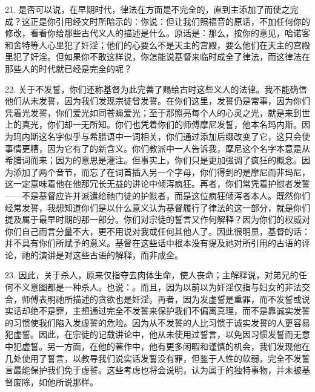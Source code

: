 21. 是否可以说，在早期时代，律法在方面是不完全的，直到主添加了而使之完成？这正是你引用经文时所暗示的：你说：但让我们照福音的原话，不加任何你的修改，看看你给那些古代义人的描述是什么。原话是：那么，按你的意见，哈诺客和舍特等人心里犯了奸淫；他们的心要么不是天主的宫殿，要么他们在天主的宫殿里犯了奸淫。但如果你不敢这样说，你怎能说基督来临时成全了律法，而这律法在那些人的时代就已经是完全的呢？\par

22. 关于不发誓，你们还称基督为此完善了赐给古时这些义人的法律。我不能确信他们从未发誓，因为我们发现宗徒曾发誓。在你们这里，发誓仍是常事，因为你们凭着光发誓，你们爱光如同苍蝇爱光；至于那照亮每个人的心灵之光，就是来到世上的真光，你们却一无所知。你们也凭着你们的师傅摩尼发誓，他本名玛内斯。因为玛内斯这名字似乎与希腊语中一词相关，你们通过添加后缀改变了它，这只会使事情更糟，因为它有了的新含义。你们教派中一人告诉我，摩尼这个名字本意是从希腊词而来；因为的意思是灌注。但事实上，你们只是更加强调了疯狂的概念。因为添加了两个音节，而忘了在词首插入另一个字母，你们得到的是摩尼而非玛尼，这一定意味着他在他那冗长无益的讲论中倾泻疯狂。再者，你们常凭着护慰者发誓——不是基督应许并派遣给祂门徒的护慰者，而是这位疯狂倾泻者本人。既然你们经常发誓，我想知道你们是以什么意义认为基督履行了律法的这一部分，就是你们提及属于最早时期的那一部分。你们对宗徒的誓言又作何解释？因为你们的权威对你们自己而言分量不大，更不用说对我或任何其他人了。因此很明显，基督的话：并不具有你们所赋予的意义。基督在这些话中根本没有提及祂对所引用的古语的评论，祂的演讲是对这些古语的解释，而非成全。\par

23. 因此，关于杀人，原来仅指夺去肉体生命，使人丧命；主解释说，对弟兄的任何不义意图都是一种杀人。也说：。而且，因为以前以为奸淫仅指与妇女的非法交合，师傅表明祂所描述的贪欲也是奸淫。再者，因为发虚誓是重罪，而不发誓或说实话却绝不是罪，主想通过完全不发誓来保护我们不偏离真理，而不是靠诚实发誓的习惯使我们陷入发虚誓的危险。因为从不发誓的人比习惯于诚实发誓的人更容易犯虚誓。因此，在宗徒的记载讲论中，他从未使用过誓言，以免因习惯发誓而无意中犯虚誓。另一方面，在他的著作中，他有更多闲暇和谨慎的机会，我们发现他在几处使用了誓言，以教导我们说实话发誓没有罪，但鉴于人性的软弱，完全不发誓言最能保护我们免于虚誓。这些考虑也将会说明，认为属于的独特事物，并未被基督废除，如他所说那样。\par

